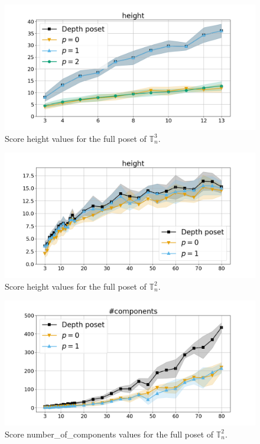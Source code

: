 \documentclass{article}
\begin{document}
    \begin{figure}[h!]
        \centering
        \hspace*{-0.24\textwidth}
        \includegraphics[width=1.4\textwidth]{pics/extended torus scores/score=height, dim=3, object=full.png}
        \caption{Score height values for the full poset of $\mathbb{T}_n^{3}$.}
        \label{fig:height-full3}
    \end{figure}
    \begin{figure}[h!]
        \centering
        \hspace*{-0.24\textwidth}
        \includegraphics[width=1.4\textwidth]{pics/extended torus scores/score=height, dim=2, object=full.png}
        \caption{Score height values for the full poset of $\mathbb{T}_n^{2}$.}
        \label{fig:height-full2}
    \end{figure}
    \begin{figure}[h!]
        \centering
        \hspace*{-0.24\textwidth}
        \includegraphics[width=1.4\textwidth]{pics/extended torus scores/score=number-of-components, dim=2, object=full.png}
        \caption{Score number\_of\_components values for the full poset of $\mathbb{T}_n^{2}$.}
        \label{fig:numberofcomponents-full2}
    \end{figure}
\end{document}
